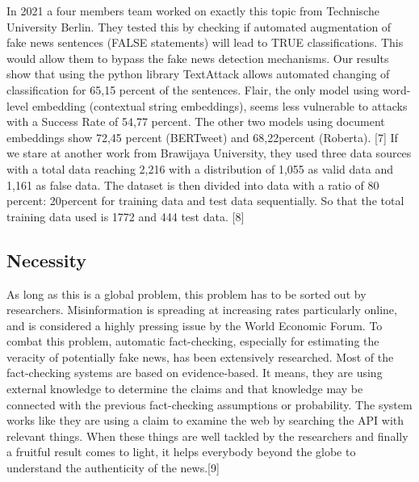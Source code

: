\documentclass[conference]{IEEEtran}
\begin{document}
In 2021 a four members team worked on exactly this topic from Technische University Berlin. They tested this by checking if automated augmentation of fake news sentences (FALSE statements) will lead to TRUE classifications. This would allow them to bypass the fake news detection mechanisms. Our results show that using the python library TextAttack allows automated changing of classification for 65,15 percent of the sentences. Flair, the only model using word-level embedding (contextual string embeddings), seems less vulnerable to attacks with a Success Rate of 54,77 percent. The other two models using document embeddings show 72,45 percent (BERTweet) and 68,22percent (Roberta). [7]
If we stare at another work from Brawijaya University, they used three data sources with a total data reaching 2,216 with a distribution of 1,055 as valid data and 1,161 as false data. The dataset is then divided into data with a ratio of 80 percent: 20percent for training data and test data sequentially. So that the total training data used is 1772 and 444 test data. [8]

\subsection{Necessity}
As long as this is a global problem, this problem has to be sorted out by researchers. Misinformation is spreading at increasing rates particularly online, and is considered a highly pressing issue by the World Economic Forum. To combat this problem, automatic fact-checking, especially for estimating the veracity of potentially fake news, has been extensively researched. Most of the fact-checking systems are based on evidence-based. It means, they are using external knowledge to determine the claims and that knowledge may be connected with the previous fact-checking assumptions or probability. The system works like they are using a claim to examine the web by searching the API with relevant things. When these things are well tackled by the researchers and finally a fruitful result comes to light, it helps everybody beyond the globe to understand the authenticity of the news.[9] 
\end{document}
